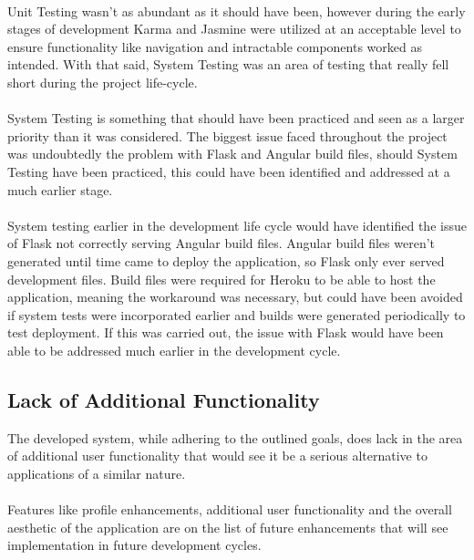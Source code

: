 \paragraph{}
Unit Testing wasn't as abundant as it should have been, however during the early stages of development Karma and Jasmine were utilized at an acceptable level to ensure functionality like navigation and intractable components worked as intended. With that said, System Testing was an area of testing that really fell short during the project life-cycle.

\paragraph{}
System Testing is something that should have been practiced and seen as a larger priority than it was considered. The biggest issue faced throughout the project was undoubtedly the problem with Flask and Angular build files, should System Testing have been practiced, this could have been identified and addressed at a much earlier stage.

\paragraph{}
System testing earlier in the development life cycle would have identified the issue of Flask not correctly serving Angular build files. Angular build files weren't generated until time came to deploy the application, so Flask only ever served development files. Build files were required for Heroku to be able to host the application, meaning the workaround was necessary, but could have been avoided if system tests were incorporated earlier and builds were generated periodically to test deployment. If this was carried out, the issue with Flask would have been able to be addressed much earlier in the development cycle.

\subsection{Lack of Additional Functionality}
The developed system, while adhering to the outlined goals, does lack in the area of additional user functionality that would see it be a serious alternative to applications of a similar nature.

\paragraph{}
Features like profile enhancements, additional user functionality and the overall aesthetic of the application are on the list of future enhancements that will see implementation in future development cycles.

